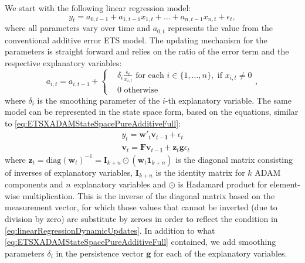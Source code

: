\documentclass[]{book}
\theoremstyle{definition}
\theoremstyle{definition}
\theoremstyle{definition}
\theoremstyle{definition}
\theoremstyle{remark}
\begin{document}
We start with the following linear regression model:
\begin{equation}
    y_{t} = a_{0,t-1} + a_{1,t-1} x_{1,t} + \dots + a_{n,t-1} x_{n,t} + \epsilon_t ,
  \label{eq:linearRegressionDynamic}
\end{equation}
where all parameters vary over time and \(a_{0,t}\) represents the value from the conventional additive error ETS model. The updating mechanism for the parameters is straight forward and relies on the ratio of the error term and the respective explanatory variables:
\begin{equation}
    a_{i,t} = a_{i,t-1} + \left \lbrace \begin{aligned}
                  &\delta_i \frac{\epsilon_t}{x_{i,t}} \text{ for each } i \in \{1, \dots, n\}, \text{ if } x_{i,t}\neq 0 \\
                  &0 \text{ otherwise }
            \end{aligned} \right. ,
  \label{eq:linearRegressionDynamicUpdates}
\end{equation}
where \(\delta_i\) is the smoothing parameter of the \(i\)-th explanatory variable. The same model can be represented in the state space form, based on the equations, similar to \eqref{eq:ETSXADAMStateSpacePureAdditiveFull}:
\begin{equation}
  \begin{aligned}
    & {y}_{t} = \mathbf{w}'_t \mathbf{v}_{t-\mathbf{l}} + \epsilon_t \\
    & \mathbf{v}_t = \mathbf{F} \mathbf{v}_{t-\mathbf{l}} + \mathbf{z}_t \mathbf{g} \epsilon_t
  \end{aligned}
  \label{eq:ADAMETSXPureAdditiveDynamicFull}
\end{equation}
where \(\mathbf{z}_t = \mathrm{diag}\left(\mathbf{w}_t\right)^{-1}=\mathbf{I}_{k+n} \odot (\mathbf{w}_t \mathbf{1}_{k+n})\) is the diagonal matrix consisting of inverses of explanatory variables, \(\mathbf{I}_{k+n}\) is the identity matrix for \(k\) ADAM components and \(n\) explanatory variables and \(\odot\) is Hadamard product for element-wise multiplication. This is the inverse of the diagonal matrix based on the measurement vector, for which those values that cannot be inverted (due to division by zero) are substitute by zeroes in order to reflect the condition in \eqref{eq:linearRegressionDynamicUpdates}. In addition to what \eqref{eq:ETSXADAMStateSpacePureAdditiveFull} contained, we add smoothing parameters \(\delta_i\) in the persistence vector \(\mathbf{g}\) for each of the explanatory variables.
\end{document}
